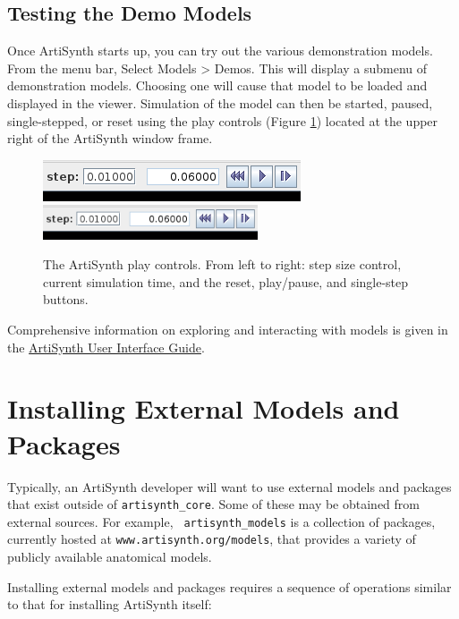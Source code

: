 \subsection{Testing the Demo Models}

Once ArtiSynth starts up, you can try out the various demonstration
models. From the menu bar, Select {\sf Models > Demos}.  This
will display a submenu of demonstration models. Choosing one will
cause that model to be loaded and displayed in the viewer.  Simulation
of the model can then be started, paused, single-stepped, or reset
using the play controls (Figure \ref{PlayControlsFig})
located at the upper right of the ArtiSynth window frame.

\begin{figure}
\begin{center}
\iflatexml
\includegraphics[]{images/playControls}
\else
\includegraphics[width=2.5in]{images/playControls}
\fi
\end{center}
\caption{The ArtiSynth play controls. From left to right: step size
control, current simulation time, and the reset, play/pause, and
single-step buttons.}%
\label{PlayControlsFig}
\end{figure}

Comprehensive information on exploring and interacting with models is
given in the
\href{http://www.artisynth.org/doc/html/uiguide/uiguide.html}
{ArtiSynth User Interface Guide}.

\section{Installing External Models and Packages}
\label{AdditionalModelsAndPackages}

Typically, an ArtiSynth developer will want to use external models and
packages that exist outside of {\tt artisynth\_core}.  Some of these
may be obtained from external sources.  For example, {\tt
artisynth\_models} is a collection of packages, currently hosted at
{\tt www.artisynth.org/models}, that provides a variety of publicly
available anatomical models.

Installing external models and packages requires a sequence of
operations similar to that for installing ArtiSynth itself:

